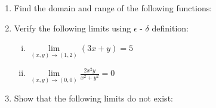 \documentclass[journal,12pt,twocolumn]{IEEEtran}
\begin{document}
\begin{enumerate}


\item Find the domain and range of the following functions:

\begin{enumerate}[(i)]
\end{enumerate}

\item Verify the following limits using $\epsilon $ - $\delta $ definition:

\begin{enumerate}[(i)]

\item $
\lim\limits_{(x,y) \to (1,2)} (3x+y)=5
$

\item $
\lim\limits_{(x,y) \to (0,0)} \frac{2x^2y}{x^2+y^2}=0
$

\end{enumerate}

\item Show that the following limits do not exist:

\begin{enumerate}[(i)]
\begin{multicols}{2}


\end{multicols}
\end{enumerate}
\end{enumerate}
\end{document}
